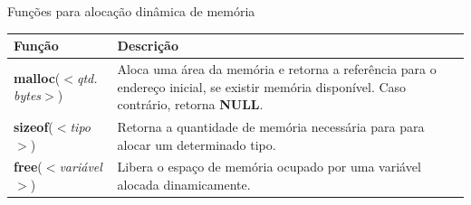 \begin{frame}[fragile,c]{Funções para alocação dinâmica de memória}
  \begin{table}
   \centering
    \begin{tabular}{p{4cm}p{6cm}}
      \hline \textbf{Função} & \textbf{Descrição} \\
      \hline  \textbf{malloc}(\textit{$<$qtd. bytes$>$}) & Aloca uma área da memória e retorna a referência para o endereço inicial, se existir memória disponível. Caso contrário, retorna \textbf{NULL}.  \\
      \hline \textbf{sizeof}(\textit{$<$tipo$>$})  & Retorna a quantidade de memória necessária para para alocar um determinado tipo.\\
      \hline \textbf{free}(\textit{$<$variável$>$})  & Libera o espaço de memória ocupado por uma variável alocada dinamicamente.\\
      \hline
    \end{tabular}
  \end{table} 
\end{frame}
